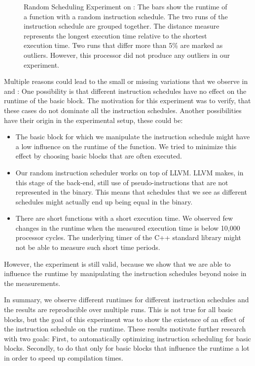 \begin{figure}
    \caption[Random Scheduling Experiment on \aurora{}]{Random Scheduling Experiment on \aurora{}:
    The bars show the runtime of a function with a random instruction schedule.
    The two runs of the instruction schedule are grouped together.
    The distance measure represents the longest execution time relative to the shortest execution time.
    Two runs that differ more than 5\% are marked as outliers.
    However, this processor did not produce any outliers in our experiment.}
    \label{fig:eval:rndm:aurora}
\end{figure}

Multiple reasons could lead to the small or missing variations that we observe in  and :
One possibility is that different instruction schedules have no effect on the runtime of the basic block.
The motivation for this experiment was to verify, that these cases do not dominate all the instruction schedules.
Another possibilities have their origin in the experimental setup, these could be:
\begin{itemize}
    \item The basic block for which we manipulate the instruction schedule might have a low influence on the runtime of the function.
        We tried to minimize this effect by choosing basic blocks that are often executed.
    \item Our random instruction scheduler works on top of LLVM.
        LLVM makes, in this stage of the back-end, still use of pseudo-instructions that are not represented in the binary.
        This means that schedules that we see as different schedules might actually end up being equal in the binary.
    \item There are short functions with a short execution time.
        We observed few changes in the runtime when the measured execution time is below 10,000 processor cycles.
        The underlying timer of the C++ standard library might not be able to measure such short time periods.  
\end{itemize}
However, the experiment is still valid, because we show that we are able to influence the runtime by manipulating the instruction schedules beyond noise in the measurements.

In summary, we observe different runtimes for different instruction schedules and the results are reproducible over multiple runs.
This is not true for all basic blocks, but the goal of this experiment was to show the existence of an effect of the instruction schedule on the runtime.
These results motivate further research with two goals:
First, to automatically optimizing instruction scheduling for basic blocks.
Secondly, to do that only for basic blocks that influence the runtime a lot in order to speed up compilation times.


